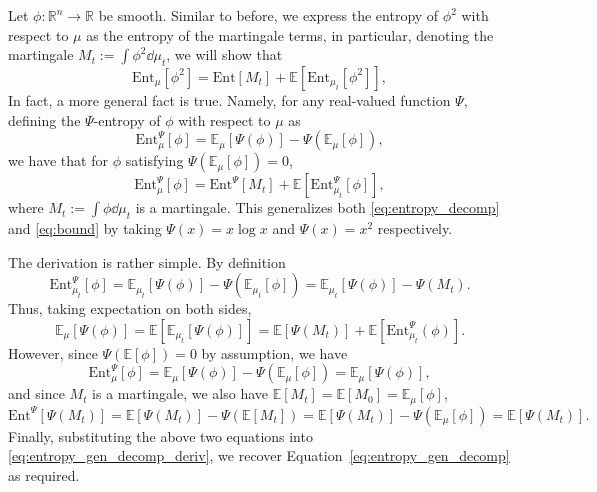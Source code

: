 
Let \(\phi : \mathbb{R}^n \to \mathbb{R}\) be smooth. 
Similar to before, we express the entropy of \(\phi^2\) with respect to \(\mu\) as 
the entropy of the martingale terms, in particular, denoting the martingale \(M_t := \int \phi^2 \dd \mu_t\), 
we will show that
\begin{equation}\label{eq:entropy_decomp}
  \text{Ent}_\mu[\phi^2] = \text{Ent}[M_t] + \mathbb{E}[\text{Ent}_{\mu_t}[\phi^2]],
\end{equation}
In fact, a more general fact is true. Namely, for any real-valued function \(\Psi\), defining 
the \(\Psi\)-entropy of \(\phi\) with respect to \(\mu\) as
\[\text{Ent}_\mu^\Psi[\phi] = \mathbb{E}_\mu[\Psi(\phi)] - \Psi(\mathbb{E}_\mu[\phi]),\]
we have that for \(\phi\) satisfying \(\Psi(\mathbb{E}_\mu[\phi]) = 0\),
\begin{equation}\label{eq:entropy_gen_decomp}
  \text{Ent}_\mu^\Psi[\phi] = \text{Ent}^\Psi[M_t] + \mathbb{E}[\text{Ent}_{\mu_t}^\Psi[\phi]],
\end{equation}
where \(M_t := \int \phi \dd\mu_t\) is a martingale. 
This generalizes both \eqref{eq:entropy_decomp} and \eqref{eq:bound} by taking \(\Psi(x) = x\log x\) and \(\Psi(x) = x^2\)
respectively. 

The derivation is rather simple. By definition
\[\text{Ent}_{\mu_t}^\Psi[\phi] = \mathbb{E}_{\mu_t}[\Psi(\phi)] - \Psi(\mathbb{E}_{\mu_t}[\phi])
  = \mathbb{E}_{\mu_t}[\Psi(\phi)] - \Psi(M_t).\]
Thus, taking expectation on both sides, 
\begin{equation}\label{eq:entropy_gen_decomp_deriv}
  \mathbb{E}_\mu[\Psi(\phi)] = \mathbb{E}[\mathbb{E}_{\mu_t}[\Psi(\phi)]] = \mathbb{E}[\Psi(M_t)] + \mathbb{E}[\text{Ent}_{\mu_t}^\Psi(\phi)].
\end{equation}
However, since \(\Psi(\mathbb{E}[\phi]) = 0\) by assumption, we have 
\[\text{Ent}_\mu^\Psi[\phi] = \mathbb{E}_\mu[\Psi(\phi)] - \Psi(\mathbb{E}_\mu[\phi]) = \mathbb{E}_\mu[\Psi(\phi)],\]
and since \(M_t\) is a martingale, we also have \(\mathbb{E}[M_t] = \mathbb{E}[M_0] = \mathbb{E}_\mu[\phi]\),
\[\text{Ent}^\Psi[\Psi(M_t)] = \mathbb{E}[\Psi(M_t)] - \Psi(\mathbb{E}[M_t]) = 
  \mathbb{E}[\Psi(M_t)] - \Psi(\mathbb{E}_\mu[\phi]) = \mathbb{E}[\Psi(M_t)].\]
Finally, substituting the above two equations into \eqref{eq:entropy_gen_decomp_deriv}, we recover 
Equation~\eqref{eq:entropy_gen_decomp} as required.

